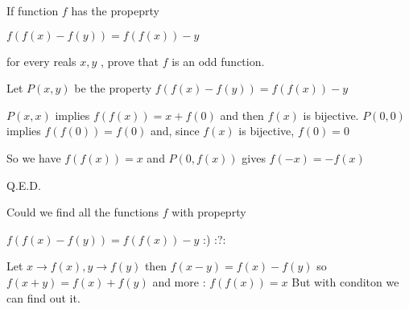 \begin{mysolution}
	\begin{tcolorbox}If function $ f$ has the propeprty 

  $ f(f(x) - f(y)) = f(f(x)) - y$ 

for every reals $ x , y$ , prove that $ f$ is an odd function.\end{tcolorbox}

Let $ P(x,y)$ be the property $ f(f(x) - f(y)) = f(f(x)) - y$

$ P(x,x)$ implies $ f(f(x))=x+f(0)$ and then $ f(x)$ is bijective.
$ P(0,0)$ implies $ f(f(0))=f(0)$ and, since $ f(x)$ is bijective, $ f(0)=0$

So we have $ f(f(x))=x$ and $ P(0,f(x))$ gives $ f(-x)=-f(x)$

Q.E.D.
\end{mysolution}



\begin{mysolution}
	Could we find all the functions 
 $ f$ with propeprty 

  $ f(f(x) - f(y)) = f(f(x)) - y$    :)  :?:
\end{mysolution}



\begin{mysolution}
	Let $ x\to f(x),y\to f(y)$ then
$ f(x-y)=f(x)-f(y)$ so $ f(x+y)=f(x)+f(y)$ and more : 
$ f(f(x))=x$
But with conditon we can find out it.
\end{mysolution}



